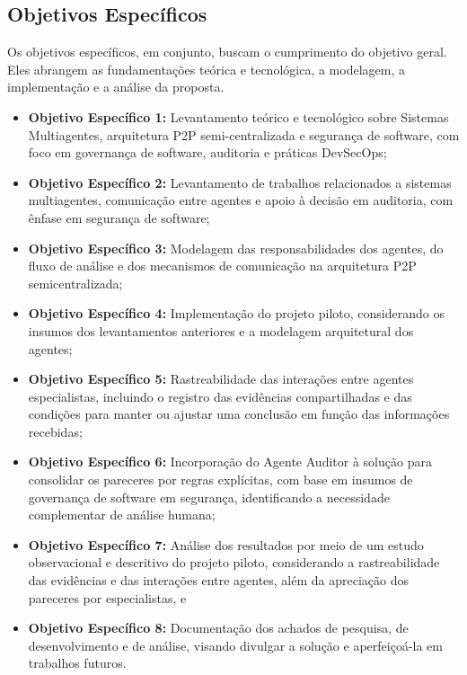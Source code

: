 \subsection{Objetivos Específicos}
\label{intro-objetivos-especificos}

Os objetivos específicos, em conjunto, buscam o cumprimento do objetivo geral. Eles abrangem as fundamentações teórica e tecnológica, a modelagem, a implementação e a análise da proposta.

\begin{itemize}
    \item \textbf{Objetivo Específico 1:} Levantamento teórico e tecnológico sobre Sistemas Multiagentes, arquitetura P2P semi-centralizada e segurança de software, com foco em governança de software, auditoria e práticas DevSecOps;
    \item \textbf{Objetivo Específico 2:} Levantamento de trabalhos relacionados a sistemas multiagentes, comunicação entre agentes e apoio à decisão em auditoria, com ênfase em segurança de software;
    \item \textbf{Objetivo Específico 3:} Modelagem das responsabilidades dos agentes, do fluxo de análise e dos mecanismos de comunicação na arquitetura P2P semicentralizada;
    \item \textbf{Objetivo Específico 4:} Implementação do projeto piloto, considerando os insumos dos levantamentos anteriores e a modelagem arquitetural dos agentes;
    \item \textbf{Objetivo Específico 5:} Rastreabilidade das interações entre agentes especialistas, incluindo o registro das evidências compartilhadas e das condições para manter ou ajustar uma conclusão em função das informações recebidas;
    \item \textbf{Objetivo Específico 6:} Incorporação do Agente Auditor à solução para consolidar os pareceres por regras explícitas, com base em insumos de governança de software em segurança, identificando a necessidade complementar de análise humana;
    \item \textbf{Objetivo Específico 7:} Análise dos resultados por meio de um estudo observacional e descritivo do projeto piloto, considerando a rastreabilidade das evidências e das interações entre agentes, além da apreciação dos pareceres por especialistas, e
    \item \textbf{Objetivo Específico 8:} Documentação dos achados de pesquisa, de desenvolvimento e de análise, visando divulgar a solução e aperfeiçoá-la em trabalhos futuros.
\end{itemize}

